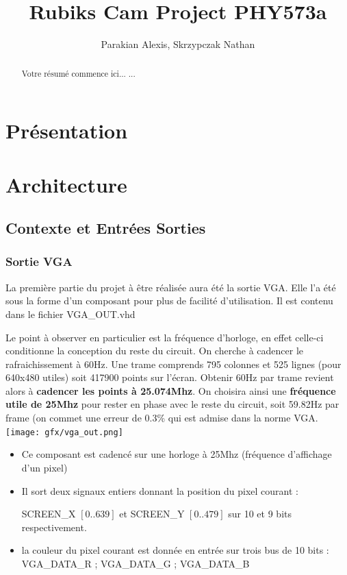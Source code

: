 \documentclass[10pt,a4paper]{article}
\author{Parakian Alexis, Skrzypczak Nathan}
\title{Rubiks Cam Project PHY573a}
\begin{document}
\maketitle
\begin{abstract}
   Votre résumé commence ici...
   ...
\end{abstract}


\section{Présentation}



\section{Architecture}

\subsection{Contexte et Entrées Sorties}


\subsubsection{Sortie VGA}
La première partie du projet à être réalisée aura été la sortie VGA. Elle l'a été sous la forme d'un composant pour plus de facilité d'utilisation. Il est contenu dans le fichier VGA\_OUT.vhd

Le point à observer en particulier est la fréquence d'horloge, en effet celle-ci conditionne la conception du reste du circuit.  On cherche à cadencer le rafraichissement à 60Hz. Une trame comprends 795 colonnes et 525 lignes (pour 640x480 utiles) soit 417900 points sur l'écran. Obtenir 60Hz par trame revient alors à \textbf{cadencer les points à 25.074Mhz}. On choisira ainsi une \textbf{fréquence utile de 25Mhz} pour rester en phase avec le reste du circuit, soit 59.82Hz par frame (on commet une erreur de 0.3\% qui est admise dans la norme VGA.
\texttt{[image: gfx/vga\_out.png]}

\begin{itemize}
\item Ce composant est cadencé sur une horloge à 25Mhz (fréquence d'affichage d'un pixel)
\item Il sort deux signaux entiers donnant la position du pixel courant :

SCREEN\_X $\left[ 0 .. 639 \right]$ et SCREEN\_Y $\left[ 0 .. 479 \right]$ sur 10 et 9 bits respectivement.
\item la couleur du pixel courant est donnée en entrée sur trois bus de 10 bits : VGA\_DATA\_R ; VGA\_DATA\_G ; VGA\_DATA\_B
\end{itemize}
\end{document}
